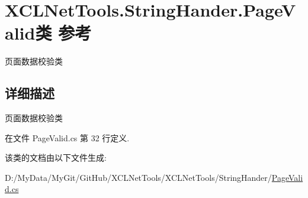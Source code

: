 \hypertarget{class_x_c_l_net_tools_1_1_string_hander_1_1_page_valid}{\section{X\-C\-L\-Net\-Tools.\-String\-Hander.\-Page\-Valid类 参考}
\label{class_x_c_l_net_tools_1_1_string_hander_1_1_page_valid}
}


页面数据校验类  




\subsection{详细描述}
页面数据校验类 



在文件 Page\-Valid.\-cs 第 32 行定义.



该类的文档由以下文件生成\-:\begin{DoxyCompactItemize}
\item 
D\-:/\-My\-Data/\-My\-Git/\-Git\-Hub/\-X\-C\-L\-Net\-Tools/\-X\-C\-L\-Net\-Tools/\-String\-Hander/\hyperlink{_page_valid_8cs}{Page\-Valid.\-cs}\end{DoxyCompactItemize}

